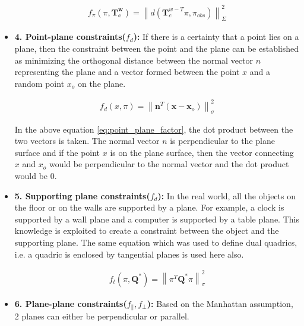 \documentclass{article}
\begin{document}
\begin{itemize}
\begin{equation}
{
\begin{aligned}
f_{\pi}\left(\pi, \mathbf{T}_{\mathbf{c}}^{\mathbf{w}}\right)=\left\|d\left(\mathbf{T}_{c}^{w-T} \pi, \pi_{o b s}\right)\right\|_{\Sigma}^{2}
\end{aligned}
} \label{eq:plane_factor}
\end{equation}

\item \textbf{4. Point-plane constraints($f_{d}$): } If there is a certainty that a point lies on a plane, then the constraint between the point and the plane can be established as minimizing the orthogonal distance between the normal vector $n$ representing the plane and a vector formed between the point $x$ and a random point $x_o$ on the plane.

\begin{equation}
{
\begin{aligned}
f_{d}(x, \pi)=\left\|\mathbf{n}^{T}\left(\mathbf{x}-\mathbf{x}_{o}\right)\right\|_{\sigma}^{2}
\end{aligned}
} \label{eq:point_plane_factor}
\end{equation}

In the above equation \ref{eq:point_plane_factor}, the dot product between the two vectors is taken. The normal vector $n$ is perpendicular to the plane surface and if the point $x$ is on the plane surface, then the vector connecting $x$ and $x_o$ would be perpendicular to the normal vector and the dot product would be 0.

\item \textbf{5. Supporting plane constraints($f_{d}$): } In the real world, all the objects on the floor or on the walls are supported by a plane. For example, a clock is supported by a wall plane and a computer is supported by a table plane. This knowledge is exploited to create a constraint between the object and the supporting plane. The same equation which was used to define dual quadrics, i.e. a quadric is enclosed by tangential planes is used here also.

\begin{equation}
{
\begin{aligned}
f_{t}\left(\pi, \mathbf{Q}^{*}\right)=\left\|\pi^{T} \mathbf{Q}^{*} \pi\right\|_{\sigma}^{2}
\end{aligned}
} \label{eq:support_plane_factor}
\end{equation}


\item \textbf{6. Plane-plane constraints($f_{\|}, f_{\perp}$): } Based on the Manhattan assumption, 2 planes can either be perpendicular or parallel.


\end{itemize}
\end{document}

